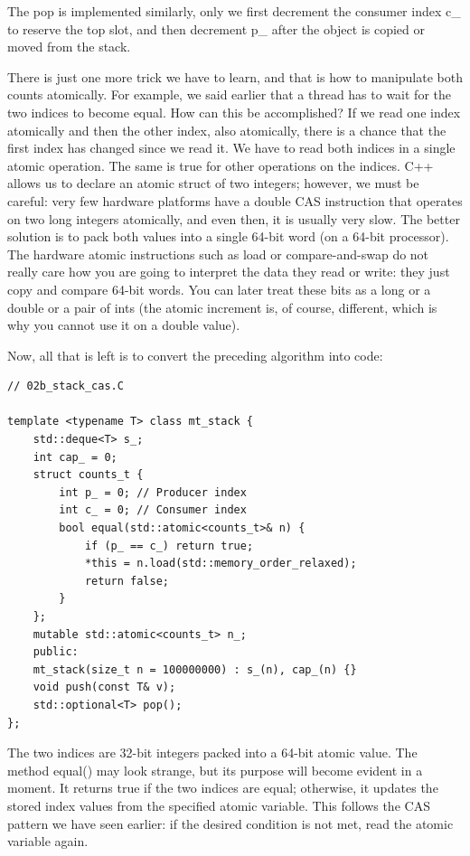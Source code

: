 The pop is implemented similarly, only we first decrement the consumer index c\_ to reserve the top slot, and then decrement p\_ after the object is copied or moved from the stack.

There is just one more trick we have to learn, and that is how to manipulate both counts atomically. For example, we said earlier that a thread has to wait for the two indices to become equal. How can this be accomplished? If we read one index atomically and then the other index, also atomically, there is a chance that the first index has changed since we read it. We have to read both indices in a single atomic operation. The same is true for other operations on the indices. C++ allows us to declare an atomic struct of two integers; however, we must be careful: very few hardware platforms have a double CAS instruction that operates on two long integers atomically, and even then, it is usually very slow. The better solution is to pack both values into a single 64-bit word (on a 64-bit processor). The hardware atomic instructions such as load or compare-and-swap do not really care how you are going to interpret the data they read or write: they just copy and compare 64-bit words. You can later treat these bits as a long or a double or a pair of ints (the atomic increment is, of course, different, which is why you cannot use it on a double value).

Now, all that is left is to convert the preceding algorithm into code:

\begin{lstlisting}[style=styleCXX]
// 02b_stack_cas.C

template <typename T> class mt_stack {
	std::deque<T> s_;
	int cap_ = 0;
	struct counts_t {
		int p_ = 0; // Producer index
		int c_ = 0; // Consumer index
		bool equal(std::atomic<counts_t>& n) {
			if (p_ == c_) return true;
			*this = n.load(std::memory_order_relaxed);
			return false;
		}
	};
	mutable std::atomic<counts_t> n_;
	public:
	mt_stack(size_t n = 100000000) : s_(n), cap_(n) {}
	void push(const T& v);
	std::optional<T> pop();
};
\end{lstlisting}

The two indices are 32-bit integers packed into a 64-bit atomic value. The method equal() may look strange, but its purpose will become evident in a moment. It returns true if the two indices are equal; otherwise, it updates the stored index values from the specified atomic variable. This follows the CAS pattern we have seen earlier: if the desired condition is not met, read the atomic variable again.

